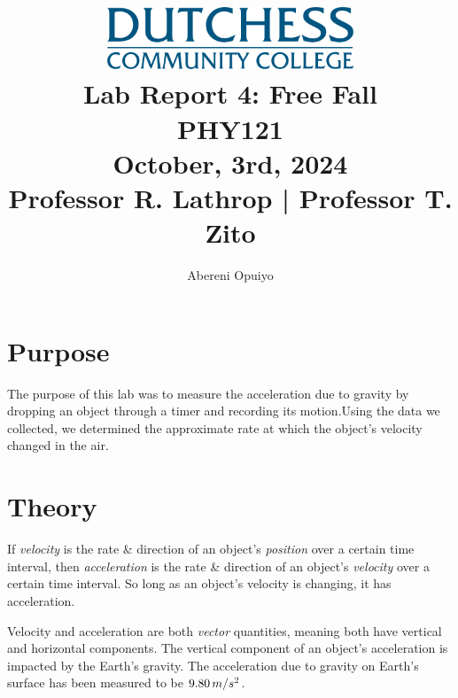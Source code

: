 \documentclass[a4paper,12pt]{article}
\title{
    \vspace{5cm} %
    \includegraphics[width=0.55\textwidth]{dutchess-logo-blue.png} \\ %
    \vspace{1cm} %
    \textbf{\Huge Lab Report 4: Free Fall} \\
    \vspace{1cm} %
    \large PHY121 \\
    \vspace{0.5cm} %
    \large	October, 3rd, 2024 \\ 
		\vspace{.5cm}
		\large Professor R. Lathrop | Professor T. Zito
}
\author{Abereni Opuiyo}
\date{}
\begin{document}
\maketitle
	\thispagestyle{empty}
\newpage




\setcounter{secnumdepth}{0}
\setcounter{page}{1}  %
\tableofcontents
	\thispagestyle{fancy}
\newpage




\section{Purpose}
\vspace{-0.5cm}
\singlespacing
The purpose of this lab was to measure the acceleration due to gravity by dropping an object through a timer and recording its motion.Using the data we collected, we determined the approximate rate at which the object's velocity changed in the air.




\section{Theory}
\vspace{-0.5cm}
\singlespacing

\indent If \textit{velocity} is the rate \& direction of an object's \textit{position} over a certain time interval, then \textit{acceleration} is the rate \& direction of an object's \textit{velocity} over a certain time interval. So long as an object's velocity is changing, it has acceleration.\par 


Velocity and acceleration are both \textit{vector} quantities, meaning both have vertical and horizontal components. The vertical component of an object's acceleration is impacted by the Earth's gravity. The acceleration due to gravity on Earth's surface has been measured to be \textit{$9.80\thinspace{m/s^2}$}. \par
\end{document}
